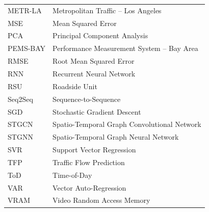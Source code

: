 \begin{longtable}{@{}p{3cm}p{10cm}@{}}
METR-LA & Metropolitan Traffic -- Los Angeles \\
MSE & Mean Squared Error \\
PCA & Principal Component Analysis \\
PEMS-BAY & Performance Measurement System -- Bay Area \\
RMSE & Root Mean Squared Error \\
RNN & Recurrent Neural Network \\
RSU & Roadside Unit \\
Seq2Seq & Sequence-to-Sequence \\
SGD & Stochastic Gradient Descent \\
STGCN & Spatio-Temporal Graph Convolutional Network \\
STGNN & Spatio-Temporal Graph Neural Network \\
SVR & Support Vector Regression \\
TFP & Traffic Flow Prediction \\
ToD & Time-of-Day \\
VAR & Vector Auto-Regression \\
VRAM & Video Random Access Memory \\
\end{longtable}

\clearpage
\listoffigures
{}
\listoftables
{}
